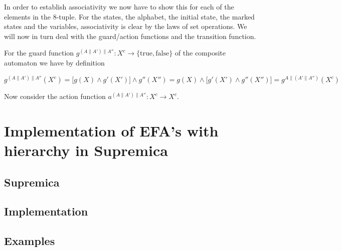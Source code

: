 \documentclass{article}
\begin{document}
\noindent In order to establish associativity we now have to show
this for each of the elements in the 8-tuple. For the states, the
alphabet, the initial state, the marked states and the variables,
associativity is clear by the laws of set operations. We will now
in turn deal with the guard/action functions and the transition
function.

For the guard function $g^{(A\|A')\|A''} : X^c \rightarrow
\{\mathrm{true}, \mathrm{false}\}$ of the composite automaton we
have by definition

\begin{equation}
  g^{(A\|A')\|A''}(X^c) = \big[g(X) \wedge g'(X') \big] \wedge g''(X'') = g(X) \wedge \big[g'(X') \wedge g''(X'')] = g^{A\|(A'\|A'')}(X^c)
\end{equation}

\noindent Now consider the action function $a^{(A\|A')\|A''} : X^c
\rightarrow X^c$.


\section{Implementation of EFA's with hierarchy in Supremica}

\subsection{Supremica}

\subsection{Implementation}\label{Implementation}
\subsection{Examples}
\end{document}
